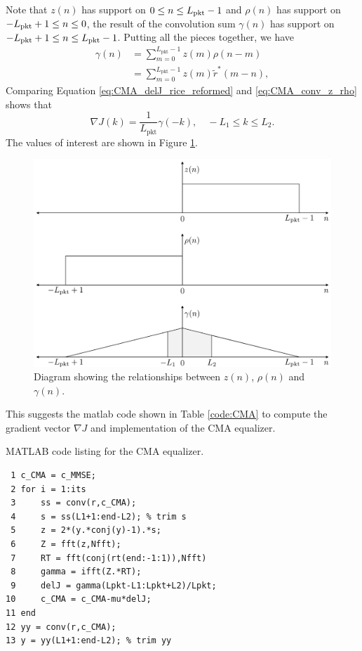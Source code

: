 Note that $z(n)$ has support on $0 \leq n \leq L_\text{pkt}-1$ and 
$\rho(n)$ has support on $-L_\text{pkt}+1 \leq n \leq 0$, 
the result of the convolution sum $\gamma(n)$ has support on $-L_\text{pkt}+1 \leq n \leq L_\text{pkt}-1$.
Putting all the pieces together, we have
\begin{align}
\gamma(n) 	&= \sum^{L_\text{pkt}-1}_{m=0} z(m) \rho(n-m) \nonumber \\
	 		&= \sum^{L_\text{pkt}-1}_{m=0} z(m) \tilde{r}^\ast(m-n),
	 \label{eq:CMA_conv_z_rho}
\end{align}
Comparing Equation \eqref{eq:CMA_delJ_rice_reformed} and \eqref{eq:CMA_conv_z_rho} shows that 
\begin{equation}
\nabla J(k) = \frac{1}{L_\text{pkt}} \gamma(-k), \quad -L_1 \leq k \leq L_2.
\label{eq:CMA_delJ_donzo}
\end{equation}
The values of interest are shown in Figure \ref{fig:convolutionFigureRice}.
\begin{figure}
	\centering\includegraphics[width=10in/100*55]{figures/eq_equations/convolutionFigureRice.pdf}
	\caption{Diagram showing the relationships between $z(n)$, $\rho(n)$ and $\gamma(n)$.}
	\label{fig:convolutionFigureRice}
\end{figure}
This suggests the matlab code shown in Table \ref{code:CMA} to compute the gradient vector $\nabla J$ and implementation of the CMA equalizer.
\begin{table}
\captionsetup{width=.8\linewidth}
\caption{MATLAB code listing for the CMA equalizer.}
\label{code:CMA}
\singlespacing
{\footnotesize
\begin{verbatim}
 1 c_CMA = c_MMSE;
 2 for i = 1:its
 3 	   ss = conv(r,c_CMA);
 4     s = ss(L1+1:end-L2); % trim s
 5     z = 2*(y.*conj(y)-1).*s;
 6     Z = fft(z,Nfft);
 7     RT = fft(conj(rt(end:-1:1)),Nfft)
 8     gamma = ifft(Z.*RT);
 9     delJ = gamma(Lpkt-L1:Lpkt+L2)/Lpkt;
10     c_CMA = c_CMA-mu*delJ;
11 end
12 yy = conv(r,c_CMA);
13 y = yy(L1+1:end-L2); % trim yy
\end{verbatim}
}
\end{table}
\doublespacing

